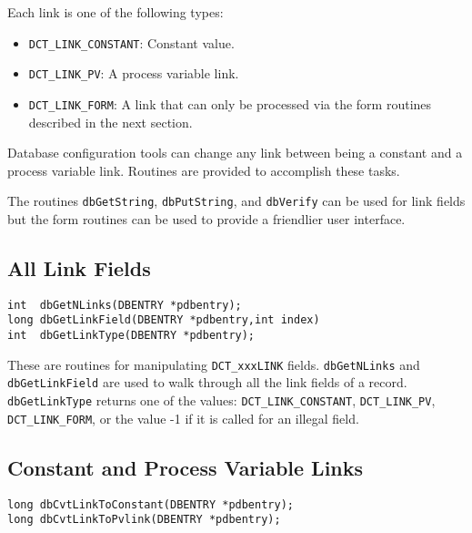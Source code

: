 Each link is one of the following types:

\begin{itemize}
\item {}\verb|DCT_LINK_CONSTANT|: Constant value.

\item {}\verb|DCT_LINK_PV|: A process variable link.

\item {}\verb|DCT_LINK_FORM|: A link that can only be processed via the form routines described in the next section.

\end{itemize}

Database configuration tools can change any link between being a constant and a process variable link.
Routines are provided to accomplish these tasks.

The routines \verb|dbGetString|, \verb|dbPutString|, and \verb|dbVerify| can be used for link fields but the form routines can be used to provide a friendlier user interface.

\subsection{All Link Fields}

\begin{verbatim}
int  dbGetNLinks(DBENTRY *pdbentry);
long dbGetLinkField(DBENTRY *pdbentry,int index)
int  dbGetLinkType(DBENTRY *pdbentry);
\end{verbatim}

These are routines for manipulating \verb|DCT_xxxLINK| fields. \verb|dbGetNLinks| and \verb|dbGetLinkField| are used to walk 
through all the link fields of a record. \verb|dbGetLinkType| returns one of the values: \verb|DCT_LINK_CONSTANT|, 
\verb|DCT_LINK_PV|, \verb|DCT_LINK_FORM|, or the value -1 if it is called for an illegal field.

\subsection{Constant and Process Variable Links}

\begin{verbatim}
long dbCvtLinkToConstant(DBENTRY *pdbentry);
long dbCvtLinkToPvlink(DBENTRY *pdbentry);
\end{verbatim}

